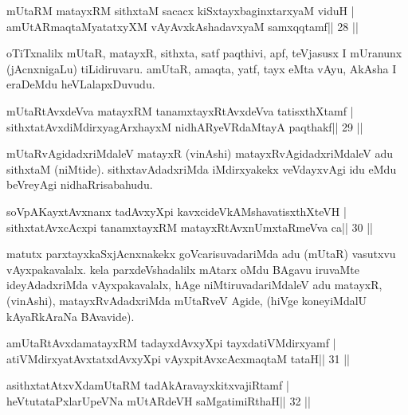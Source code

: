 \begin{shl}
mUtaRM matayxRM sithxtaM sacacx kiSxtayxbaginxtarxyaM viduH |
amUtARmaqtaMyatatxyXM vAyAvxkAshadavxyaM samxqqtamf\hfill || 28 ||
\end{shl}

\begin{artha}
oTiTxnalilx mUtaR, matayxR, sithxta, satf paqthivi, apf, teVjasusx I mUranunx (jAcnxnigaLu) tiLidiruvaru. amUtaR, amaqta, yatf, tayx eMta vAyu, AkAsha I eraDeMdu heVLalapxDuvudu.
\end{artha}



\begin{shl}
mUtaRtAvxdeVva matayxRM tanamxtayxRtAvxdeVva tatisxthXtamf |
sithxtatAvxdiMdirxyagArxhayxM nidhARyeVRdaMtayA paqthakf\hfill || 29 ||
\end{shl}

\begin{artha}
mUtaRvAgidadxriMdaleV matayxR (vinAshi) matayxRvAgidadxriMdaleV adu sithxtaM (niMtide). sithxtavAdadxriMda iMdirxyakekx veVdayxvAgi idu eMdu beVreyAgi nidhaRrisabahudu.
\end{artha}



\begin{shl}
soVpAKayxtAvxnanx tadAvxyXpi kavxcideVkAMshavatisxthXteVH |
sithxtatAvxcAcxpi tanamxtayxRM matayxRtAvxnUmxtaRmeVva ca\hfill || 30 ||
\end{shl}

\begin{artha}
matutx parxtayxkaSxjAcnxnakekx goVcarisuvadariMda adu (mUtaR) vasutxvu vAyxpakavalalx. kela parxdeVshadalilx mAtarx oMdu BAgavu iruvaMte  ideyAdadxriMda vAyxpakavalalx, hAge niMtiruvadariMdaleV adu matayxR, (vinAshi), matayxRvAdadxriMda mUtaRveV Agide, (hiVge koneyiMdalU kAyaRkAraNa BAvavide).
\end{artha}



\begin{shl}
amUtaRtAvxdamatayxRM tadayxdAvxyXpi tayxdatiVMdirxyamf |
atiVMdirxyatAvxtatxdAvxyXpi vAyxpitAvxcAcxmaqtaM tataH\hfill || 31 ||
\end{shl}

\begin{shl}
asithxtatAtxvXdamUtaRM tadAkAravayxkitxvajiRtamf |
heVtutataPxlarUpeVNa mUtARdeVH saMgatimiRthaH\hfill || 32 ||
\end{shl}

